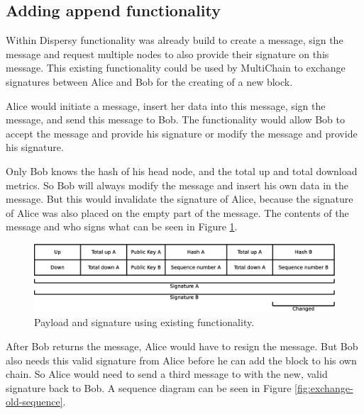 \subsection{Adding append functionality}
Within Dispersy functionality was already build to create a message, sign the message
and request multiple nodes to also provide their signature on this message.
This existing functionality could be used by MultiChain to exchange signatures
between Alice and Bob for the creating of a new block.

Alice would initiate a message, insert her data into this message, sign the message, and send this message to Bob.
The functionality would allow Bob to accept the message and provide his signature or
modify the message and provide his signature.

Only Bob knows the hash of his head node, and the total up and total download metrics.
So Bob will always modify the message and insert his own data in the message.
But this would invalidate the signature of Alice,
because the signature of Alice was also placed on the empty part of the message.
The contents of the message and who signs what can be seen in Figure \ref{fig:payload-signature-old}.

\begin{figure}
	\centerline{\includegraphics[scale=0.3]{design/figs/signature_old.eps}}
	\caption{Payload and signature using existing functionality.}
	\label{fig:payload-signature-old}
\end{figure}


After Bob returns the message,
Alice would have to resign the message.
But Bob also needs this valid signature from Alice before he can add the block to his own chain.
So Alice would need to send a third message to with the new, valid signature back to Bob.
A sequence diagram can be seen in Figure \ref{fig:exchange-old-sequence}.

